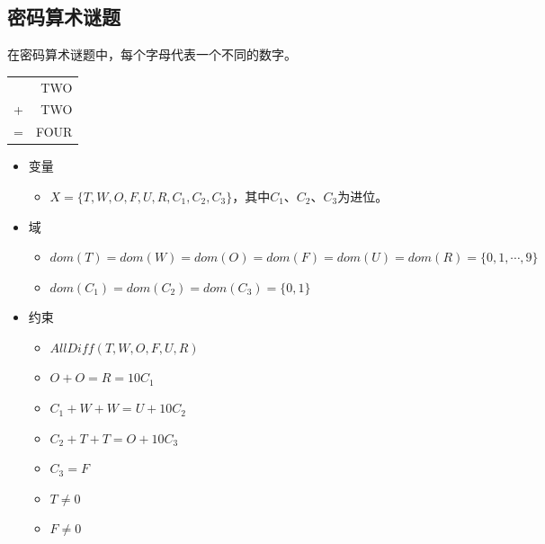 \vspace{0.5cm}

\subsection{密码算术谜题}

在密码算术谜题中，每个字母代表一个不同的数字。

\begin{table}[H]
    \centering
    \begin{tabular}{cD{.}{.}{3}}
          & TWO  \\
        + & TWO  \\
        \hline
        = & FOUR
    \end{tabular}
\end{table}

\begin{itemize}
    \item 变量
          \begin{itemize}
              \item $ X = \{T, W, O, F, U, R, C_1, C_2, C_3\} $，其中$ C_1 $、$ C_2 $、$ C_3 $为进位。
          \end{itemize}
    \item 域
          \begin{itemize}
              \item $ dom(T) = dom(W) = dom(O) = dom(F) = dom(U) = dom(R) = \{0, 1, \cdots, 9\} $
              \item $ dom(C_1) = dom(C_2) = dom(C_3) = \{0, 1\} $
          \end{itemize}
    \item 约束
          \begin{itemize}
              \item $ AllDiff(T, W, O, F, U, R)  $
              \item $ O + O = R = 10C_1 $
              \item $ C_1 + W + W = U + 10C_2 $
              \item $ C_2 + T + T = O + 10C_3 $
              \item $ C_3 = F $
              \item $ T \neq 0 $
              \item $ F \neq 0 $
          \end{itemize}
\end{itemize}

\vspace{0.5cm}

